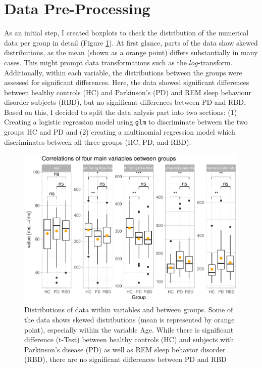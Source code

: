 \documentclass[
  english,
  doc,floatsintext]{apa6}
\begin{document}
\hypertarget{data-pre-processing}{%
\section{Data Pre-Processing}\label{data-pre-processing}}

As an initial step, I created boxplots to check the distribution of the numerical data per group
in detail (Figure \ref{fig:boxplots-and-correlations}).
At first glance, parts of the data show skewed distributions, as the mean (shown as a orange point)
differs substantially in many cases. This might prompt data transformations such as the \(log\)-transform.
Additionally, within each variable, the distributions between the groups were assessed for significant differences.
Here, the data showed significant differences between healthy controls (HC) and Parkinson's (PD) and REM sleep
behaviour disorder subjects (RBD), but no significant differences between PD and RBD. Based on this, I decided
to split the data anlysis part into two sections: (1) Creating a logistic regression model using \texttt{glm} to
discriminate between the two groups HC and PD and (2) creating a multinomial regression model which discriminates
between all three groups (HC, PD, and RBD).

\begin{figure}

{\centering \includegraphics{dap_report_anja_probst_files/figure-latex/boxplots-and-correlations-1} 

}

\caption{Distributions of data within variables and between groups. Some of the data shows skewed distributions (mean is represented by orange point), especially within the variable Age. While there is significant difference (t-Test) between healthy controls (HC) and subjects with Parkinson's disease (PD) as well as REM sleep behavior disorder (RBD), there are no significant differences between PD and RBD}\label{fig:boxplots-and-correlations}
\end{figure}
\end{document}
